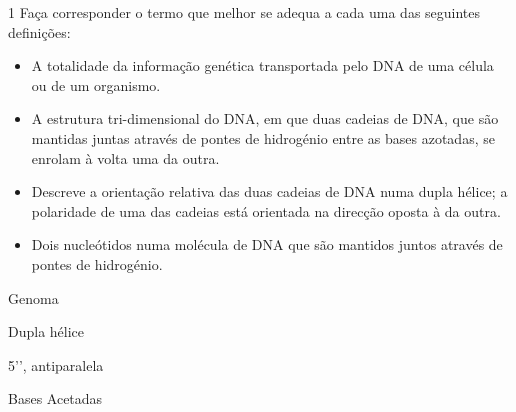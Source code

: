 \documentclass[\mainfilename]{subfiles}
\begin{document}
\begin{questionBox}1{ %
    Faça corresponder o termo que melhor se adequa a cada uma das seguintes definições:
} %
    \begin{itemize}
        \item A totalidade da informação genética transportada pelo DNA de uma célula ou de um organismo.
        \item A estrutura tri-dimensional do DNA, em que duas cadeias de DNA, que são mantidas juntas através de pontes de hidrogénio entre as bases azotadas, se enrolam à volta uma da outra.
        \item Descreve a orientação relativa das duas cadeias de DNA numa dupla hélice; a polaridade de uma das cadeias está orientada na direcção oposta à da outra.
        \item Dois nucleótidos numa molécula de DNA que são mantidos juntos através de pontes de hidrogénio.
    \end{itemize}

    \begin{answerBox}{} %
        \begin{enumerate}
            \begin{multicols}{2}
                \item Genoma
                \item Dupla hélice
                \item 5'', antiparalela
                \item Bases Acetadas
            \end{multicols}
        \end{enumerate}
    \end{answerBox}
    
\end{questionBox}
\end{document}
